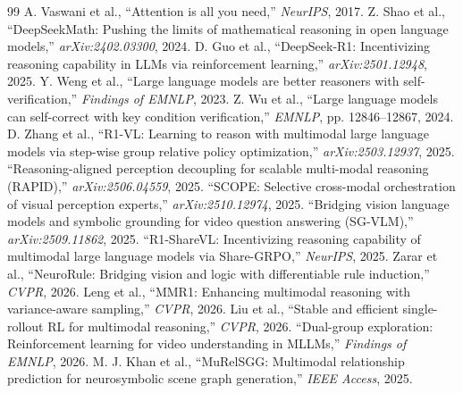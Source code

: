 \documentclass[10pt,twocolumn]{article}
\begin{document}
\begin{thebibliography}{99}
 A. Vaswani et al., ``Attention is all you need,'' \emph{NeurIPS}, 2017.
 Z. Shao et al., ``DeepSeekMath: Pushing the limits of mathematical reasoning in open language models,'' \emph{arXiv:2402.03300}, 2024.
 D. Guo et al., ``DeepSeek-R1: Incentivizing reasoning capability in LLMs via reinforcement learning,'' \emph{arXiv:2501.12948}, 2025.
 Y. Weng et al., ``Large language models are better reasoners with self-verification,'' \emph{Findings of EMNLP}, 2023.
 Z. Wu et al., ``Large language models can self-correct with key condition verification,'' \emph{EMNLP}, pp. 12846--12867, 2024.
 D. Zhang et al., ``R1-VL: Learning to reason with multimodal large language models via step-wise group relative policy optimization,'' \emph{arXiv:2503.12937}, 2025.
 ``Reasoning-aligned perception decoupling for scalable multi-modal reasoning (RAPID),'' \emph{arXiv:2506.04559}, 2025.
 ``SCOPE: Selective cross-modal orchestration of visual perception experts,'' \emph{arXiv:2510.12974}, 2025.
 ``Bridging vision language models and symbolic grounding for video question answering (SG-VLM),'' \emph{arXiv:2509.11862}, 2025.
 ``R1-ShareVL: Incentivizing reasoning capability of multimodal large language models via Share-GRPO,'' \emph{NeurIPS}, 2025.
 Zarar et al., ``NeuroRule: Bridging vision and logic with differentiable rule induction,'' \emph{CVPR}, 2026.
 Leng et al., ``MMR1: Enhancing multimodal reasoning with variance-aware sampling,'' \emph{CVPR}, 2026.
 Liu et al., ``Stable and efficient single-rollout RL for multimodal reasoning,'' \emph{CVPR}, 2026.
 ``Dual-group exploration: Reinforcement learning for video understanding in MLLMs,'' \emph{Findings of EMNLP}, 2026.
 M. J. Khan et al., ``MuRelSGG: Multimodal relationship prediction for neurosymbolic scene graph generation,'' \emph{IEEE Access}, 2025.
\end{thebibliography}
\end{document}
